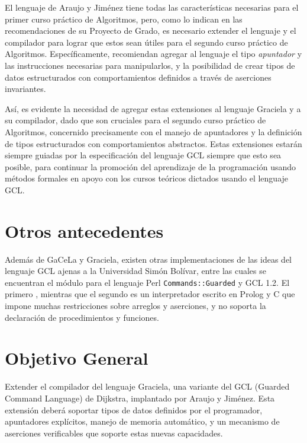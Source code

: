 El lenguaje de Araujo y Jiménez tiene todas las características necesarias para
el primer curso práctico de Algoritmos, pero, como lo indican en las
recomendaciones de su Proyecto de Grado, es necesario extender el lenguaje y el
compilador para lograr que estos sean útiles para el segundo curso práctico de
Algoritmos. Específicamente, recomiendan agregar al lenguaje el tipo
\textit{apuntador} y las instrucciones necesarias para manipularlos, y la
posibilidad de crear tipos de datos estructurados con comportamientos definidos
a través de aserciones invariantes.

Así, es evidente la necesidad de agregar estas extensiones al lenguaje Graciela
y a su compilador, dado que son cruciales para el segundo curso práctico de
Algoritmos, concernido precisamente con el manejo de apuntadores y la definición
de tipos estructurados con comportamientos abstractos. Estas extensiones estarán
siempre guiadas por la especificación del lenguaje GCL siempre que esto sea
posible, para continuar la promoción del aprendizaje de la programación usando
métodos formales en apoyo con los cursos teóricos dictados usando el lenguaje
GCL.

\section*{Otros antecedentes}

Además de GaCeLa y Graciela, existen otras implementaciones de las ideas del
lenguaje GCL ajenas a la Universidad Simón Bolívar, entre las cuales se
encuentran el módulo para el lenguaje Perl \texttt{Commands::Guarded} y GCL 1.2.
El primero , mientras que el segundo es
un interpretador escrito en Prolog y C que impone muchas restricciones sobre
arreglos y aserciones, y no soporta la declaración de procedimientos y
funciones.

\section*{Objetivo General}

Extender el compilador del lenguaje Graciela, una variante del GCL (Guarded
Command Language) de Dijkstra, implantado por Araujo y Jiménez. Esta extensión
deberá soportar tipos de datos definidos por el programador, apuntadores
explícitos, manejo de memoria automático, y un mecanismo de aserciones
verificables que soporte estas nuevas capacidades.

